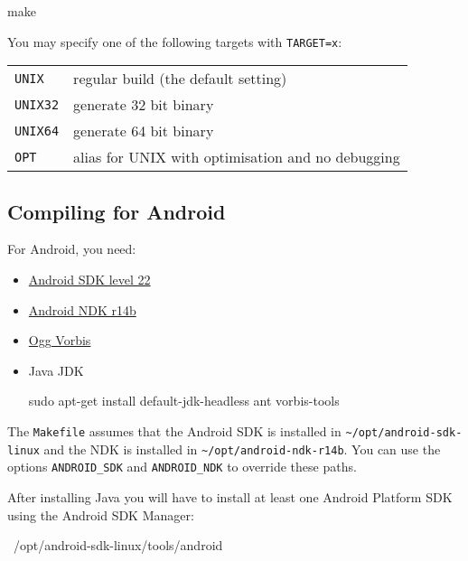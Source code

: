 \begin{verbatim*}
make
\end{verbatim*}

You may specify one of the following targets with \texttt{TARGET=x}:

\begin{tabularx}{1.9\textwidth}{lX}

\texttt{UNIX} & regular build (the default setting) \\

\texttt{UNIX32} & generate 32 bit binary \\

\texttt{UNIX64} & generate 64 bit binary \\

\texttt{OPT} & alias for UNIX with optimisation and no debugging \\

\end{tabularx}

\subsection{Compiling for Android}

For Android, you need:

\begin{itemize}
\item \href{http://developer.android.com/sdk/}{Android SDK level 22}
\item \href{http://developer.android.com/sdk/ndk/}{Android NDK r14b}
\item \href{http://www.vorbis.com/}{Ogg Vorbis}
\item {Java JDK 
\begin{verbatim*}
sudo apt-get install default-jdk-headless ant vorbis-tools
\end{verbatim*}}
\end{itemize}

The \texttt{Makefile} assumes that the Android SDK is installed in
\verb|~/opt/android-sdk-linux| and the NDK is installed in
\verb|~/opt/android-ndk-r14b|.  You can use the options
\verb|ANDROID_SDK| and \verb|ANDROID_NDK| to override these paths.

After installing Java you will have to install at least one Android Platform SDK using the Android SDK Manager:

\begin{verbatim*}
~/opt/android-sdk-linux/tools/android
\end{verbatim*}

